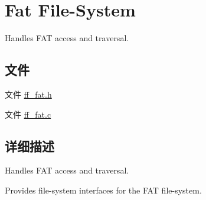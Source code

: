 \hypertarget{group___f_a_t}{}\section{Fat File-\/\+System}
\label{group___f_a_t}


Handles F\+AT access and traversal.  


\subsection*{文件}
\begin{DoxyCompactItemize}
\item 
文件 \hyperlink{ff__fat_8h}{ff\+\_\+fat.\+h}
\item 
文件 \hyperlink{ff__fat_8c}{ff\+\_\+fat.\+c}
\end{DoxyCompactItemize}


\subsection{详细描述}
Handles F\+AT access and traversal. 

Provides file-\/system interfaces for the F\+AT file-\/system. 